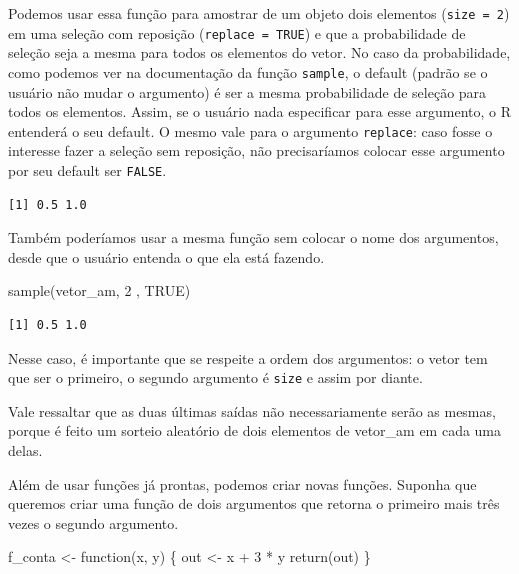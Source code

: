 \documentclass[
  letterpaper,
  DIV=11,
  numbers=noendperiod]{scrreprt}
\newenvironment{Shaded}{\begin{snugshade}}{\end{snugshade}}
\newcommand{\ConstantTok}[1]{\textcolor[rgb]{0.56,0.35,0.01}{#1}}
\newcommand{\ControlFlowTok}[1]{\textcolor[rgb]{0.00,0.23,0.31}{#1}}
\newcommand{\DecValTok}[1]{\textcolor[rgb]{0.68,0.00,0.00}{#1}}
\newcommand{\FunctionTok}[1]{\textcolor[rgb]{0.28,0.35,0.67}{#1}}
\newcommand{\NormalTok}[1]{\textcolor[rgb]{0.00,0.23,0.31}{#1}}
\newcommand{\OtherTok}[1]{\textcolor[rgb]{0.00,0.23,0.31}{#1}}
\newcommand{\SpecialCharTok}[1]{\textcolor[rgb]{0.37,0.37,0.37}{#1}}
\begin{document}
Podemos usar essa função para amostrar de um objeto dois elementos
(\texttt{size\ =\ 2}) em uma seleção com reposição
(\texttt{replace\ =\ TRUE}) e que a probabilidade de seleção seja a
mesma para todos os elementos do vetor. No caso da probabilidade, como
podemos ver na documentação da função \texttt{sample}, o default (padrão
se o usuário não mudar o argumento) é ser a mesma probabilidade de
seleção para todos os elementos. Assim, se o usuário nada especificar
para esse argumento, o R entenderá o seu default. O mesmo vale para o
argumento \texttt{replace}: caso fosse o interesse fazer a seleção sem
reposição, não precisaríamos colocar esse argumento por seu default ser
\texttt{FALSE}.

\begin{verbatim}
[1] 0.5 1.0
\end{verbatim}

Também poderíamos usar a mesma função sem colocar o nome dos argumentos,
desde que o usuário entenda o que ela está fazendo.

\begin{Shaded}
\begin{Highlighting}[]
\FunctionTok{sample}\NormalTok{(vetor\_am, }\DecValTok{2}\NormalTok{ , }\ConstantTok{TRUE}\NormalTok{) }
\end{Highlighting}
\end{Shaded}

\begin{verbatim}
[1] 0.5 1.0
\end{verbatim}

Nesse caso, é importante que se respeite a ordem dos argumentos: o vetor
tem que ser o primeiro, o segundo argumento é \texttt{size} e assim por
diante.

Vale ressaltar que as duas últimas saídas não necessariamente serão as
mesmas, porque é feito um sorteio aleatório de dois elementos de
vetor\_am em cada uma delas.

Além de usar funções já prontas, podemos criar novas funções. Suponha
que queremos criar uma função de dois argumentos que retorna o primeiro
mais três vezes o segundo argumento.

\begin{Shaded}
\begin{Highlighting}[]
\NormalTok{f\_conta }\OtherTok{\textless{}{-}} \ControlFlowTok{function}\NormalTok{(x, y) \{}
\NormalTok{  out }\OtherTok{\textless{}{-}}\NormalTok{ x }\SpecialCharTok{+} \DecValTok{3} \SpecialCharTok{*}\NormalTok{ y}
  \FunctionTok{return}\NormalTok{(out)}
\NormalTok{\}}
\end{Highlighting}
\end{Shaded}
\end{document}
